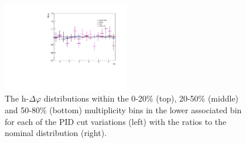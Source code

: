 \begin{figure}[ht]
    \includegraphics[width=0.49\textwidth]{figures/analysis/pid_variations_dphi_50_80_lowpt_ratio.pdf}
    \caption{The h-\lmb $\Delta\varphi$ distributions within the 0-20\% (top), 20-50\% (middle) and 50-80\% (bottom) multiplicity bins in the lower associated \pt bin for each of the PID cut variations (left) with the ratios to the nominal distribution (right).}
    \label{fig:pid_cut_variations_lowpt}
\end{figure}


